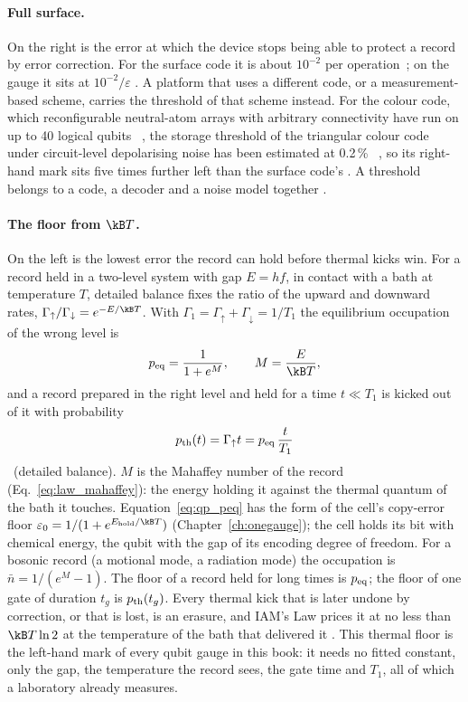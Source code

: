 \paragraph{Full surface.} On the right is the error at which the device stops being able to protect a record by error correction.
For the surface code it is about $10^{-2}$ per operation~\cite{Fowler2012}; on the gauge it sits at $10^{-2}/\varepsilon$ \calc. A
platform that uses a different code, or a measurement-based scheme, carries the threshold of that scheme instead. For the colour code, which reconfigurable neutral-atom arrays with arbitrary connectivity have run on up to 40 logical
qubits~\cite{Bluvstein2024} \observed, the storage threshold of the triangular colour code under circuit-level depolarising noise has been
estimated at 0.2\,\%~\cite{Chamberland2020NJP} \observed, so its right-hand mark sits five times further left than the surface code's
\calc. A threshold belongs to a code, a decoder and a noise model together \interp.

\paragraph{The floor from $\kB T$.} On the left is the lowest error the record can hold before thermal kicks win. For a record held
in a two-level system with gap $E=hf$, in contact with a bath at temperature $T$, detailed balance fixes the ratio of the upward and
downward rates, $\Gamma_\uparrow/\Gamma_\downarrow=e^{-E/\kB T}$. With $\Gamma_1=\Gamma_\uparrow+\Gamma_\downarrow=1/T_1$ the equilibrium
occupation of the wrong level is
\begin{equation}
 p_{\rm eq}=\frac{1}{1+e^{M}},\qquad M=\frac{E}{\kB T},
 \label{eq:qp_peq}
\end{equation}
and a record prepared in the right level and held for a time $t\ll T_1$ is kicked out of it with probability
\begin{equation}
 p_{\rm th}(t)=\Gamma_\uparrow t=p_{\rm eq}\,\frac{t}{T_1}
 \label{eq:qp_pth}
\end{equation}
\derived\ (detailed balance). $M$ is the Mahaffey number of the record (Eq.~\eqref{eq:law_mahaffey}): the energy holding it against
the thermal quantum of the bath it touches. Equation~\eqref{eq:qp_peq} has the form of the cell's copy-error floor
$\varepsilon_0=1/(1+e^{E_{\rm hold}/\kB T})$ (Chapter~\ref{ch:onegauge}); the cell holds its bit with chemical energy, the qubit with
the gap of its encoding degree of freedom. For a bosonic record (a motional mode, a radiation mode) the occupation is
$\bar n=1/(e^{M}-1)$. The floor of a record held for long times is $p_{\rm eq}$; the floor of one gate of duration $t_g$ is
$p_{\rm th}(t_g)$. Every thermal kick that is later undone by correction, or that is lost, is an erasure, and IAM's Law prices it at no
less than $\kB T\ln2$ at the temperature of the bath that delivered it \interp. This thermal floor is the left-hand mark of every qubit
gauge in this book: it needs no fitted constant, only the gap, the temperature the record sees, the gate time and $T_1$, all of which a
laboratory already measures.

